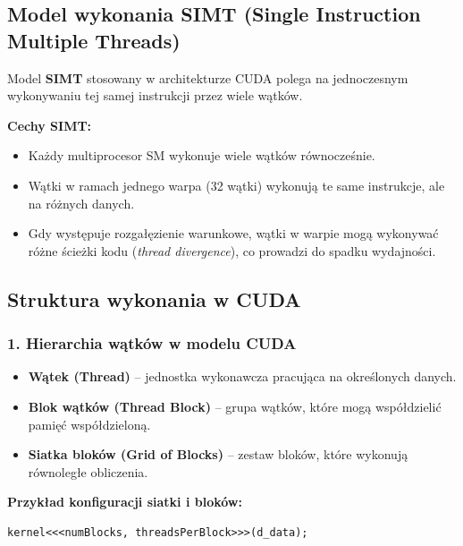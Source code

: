 \subsection{Model wykonania SIMT (Single Instruction Multiple Threads)}

Model \textbf{SIMT} stosowany w architekturze CUDA polega na jednoczesnym wykonywaniu tej samej instrukcji przez wiele wątków.

\textbf{Cechy SIMT:}
\begin{itemize}
    \item Każdy multiprocesor SM wykonuje wiele wątków równocześnie.
    \item Wątki w ramach jednego warpa (32 wątki) wykonują te same instrukcje, ale na różnych danych.
    \item Gdy występuje rozgałęzienie warunkowe, wątki w warpie mogą wykonywać różne ścieżki kodu (\textit{thread divergence}), co prowadzi do spadku wydajności.
\end{itemize}

\subsection{Struktura wykonania w CUDA}

\subsubsection{1. Hierarchia wątków w modelu CUDA}
\begin{itemize}
    \item \textbf{Wątek (Thread)} – jednostka wykonawcza pracująca na określonych danych.
    \item \textbf{Blok wątków (Thread Block)} – grupa wątków, które mogą współdzielić pamięć współdzieloną.
    \item \textbf{Siatka bloków (Grid of Blocks)} – zestaw bloków, które wykonują równoległe obliczenia.
\end{itemize}

\textbf{Przykład konfiguracji siatki i bloków:}
\begin{verbatim}
kernel<<<numBlocks, threadsPerBlock>>>(d_data);
\end{verbatim}

